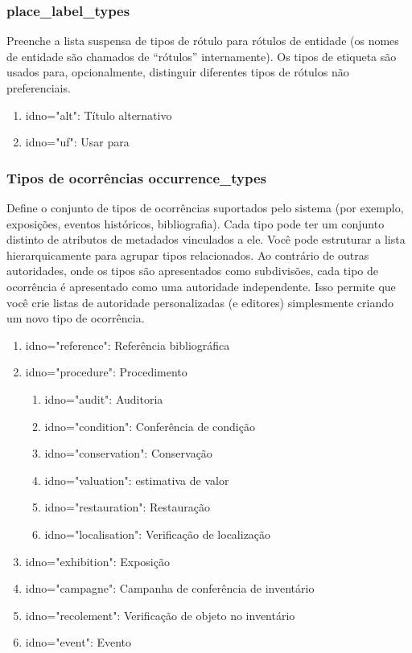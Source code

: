 \subsubsection{place\_label\_types}
Preenche a lista suspensa de tipos de rótulo para rótulos de entidade (os nomes de entidade são chamados de ``rótulos'' internamente). Os tipos de etiqueta são usados para, opcionalmente, distinguir diferentes tipos de rótulos não preferenciais.

\begin{enumerate}
	\item idno="alt": Título alternativo
	\item idno="uf": Usar para
\end{enumerate}

\subsubsection{Tipos de ocorrências occurrence\_types}
Define o conjunto de tipos de ocorrências suportados pelo sistema (por exemplo, exposições, eventos históricos, bibliografia). Cada tipo pode ter um conjunto distinto de atributos de metadados vinculados a ele. Você pode estruturar a lista hierarquicamente para agrupar tipos relacionados. Ao contrário de outras autoridades, onde os tipos são apresentados como subdivisões, cada tipo de ocorrência é apresentado como uma autoridade independente. Isso permite que você crie listas de autoridade personalizadas (e editores) simplesmente criando um novo tipo de ocorrência.

\begin{enumerate}
	\item idno="reference": Referência bibliográfica
	\item idno="procedure": Procedimento
	\begin{enumerate}
		\item idno="audit": Auditoria
		\item idno="condition": Conferência de condição
		\item idno="conservation": Conservação
		\item idno="valuation": estimativa de valor
		\item idno="restauration": Restauração
		\item idno="localisation": Verificação de localização
	\end{enumerate}
    \item idno="exhibition": Exposição
    \item idno="campagne": Campanha de conferência de inventário
    \item idno="recolement": Verificação de objeto no inventário
    \item idno="event": Evento
\end{enumerate}

